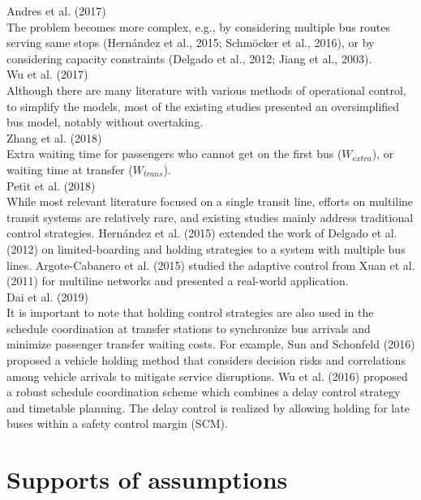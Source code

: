 \documentclass{article}
\begin{document}
\noindent \textrm{Andres et al. (2017)}\\
The problem becomes more complex, 
e.g., by considering multiple bus routes serving same stops 
\textrm{(Hernández et al., 2015; Schmöcker et al., 2016)}, 
or by considering capacity constraints 
\textrm{(Delgado et al., 2012; Jiang et al., 2003)}.\\

\noindent \textrm{Wu et al. (2017)}\\
Although there are many literature with various methods of operational control, to simplify the models, most of the
existing studies presented an oversimplified bus model, notably without overtaking.\\

\noindent \textrm{Zhang et al. (2018)}\\
Extra waiting time for passengers who cannot get on the first bus ($W_{extra}$),
 or waiting time at transfer ($W_{trans}$).\\

\noindent \textrm{Petit et al. (2018)}\\
While most relevant literature focused on a single transit line, 
efforts on multiline transit systems are relatively rare, 
and existing studies mainly address traditional control strategies.
\textrm{Hernández et al. (2015)} extended the work of \textrm{Delgado et al. (2012)} 
on limited-boarding and holding strategies to a system with multiple bus lines.
\textrm{Argote-Cabanero et al. (2015)} studied the adaptive control 
from \textrm{Xuan et al. (2011)} 
for multiline networks and presented a real-world application.\\

\noindent Dai et al. (2019)\\
It is important to note that holding control strategies are also used in the schedule coordination at transfer stations 
to synchronize bus arrivals and minimize passenger transfer waiting costs. 
For example, Sun and Schonfeld (2016) proposed a vehicle holding method 
that considers decision risks and correlations among vehicle arrivals to mitigate service disruptions. 
Wu et al. (2016) proposed a robust schedule coordination scheme which combines a delay control strategy and timetable planning. 
The delay control is realized by allowing holding for late buses within a safety control margin (SCM).

\section{Supports of assumptions}
\end{document}
